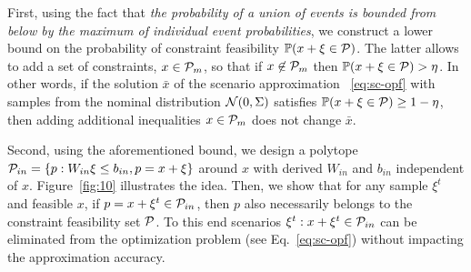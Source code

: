 \documentclass{IEEEtran4PSCC}
\newcommand{\cP}{{\cal P}}
\newcommand{\cN}{{\cal N}}
\begin{document}
First, using the fact that \emph{the probability of a union of events is bounded from below by the maximum of individual event probabilities}, we construct a lower bound on the probability of constraint feasibility $\mathbb{P}(x+\xi \in \cP)$. The latter allows to add a set of constraints, $x\in \cP_{m}$, so that if $x\not\in \cP_m$ then $\mathbb{P}(x+\xi \in \cP) > \eta$. In other words, if the solution $\bar x$ of the scenario approximation~ \eqref{eq:sc-opf} with samples from the nominal distribution $\cN(0,\Sigma)$ satisfies $\mathbb{P}(x+\xi \in \cP) \ge 1-\eta$, then adding additional inequalities $x\in \cP_{m}$ does not change $\bar x$. 

Second, using the aforementioned bound, we design a polytope $\cP_{in} = \{p: W_{in} \xi \le b_{in}, p = x+\xi\}$ around $x$ with derived $W_{in}$ and $b_{in}$ independent of $x$. Figure~\ref{fig:10} illustrates the idea. Then, we show that for any sample $\xi^t$ and feasible $x$, if $p = x+\xi^t \in \cP_{in}$, then $p$ also necessarily belongs to the constraint feasibility set $\cP$. To this end scenarios $\xi^t: x+\xi^t \in \cP_{in}$ can be eliminated from the optimization problem (see Eq.~\eqref{eq:sc-opf}) without impacting the approximation accuracy. 
\end{document}
